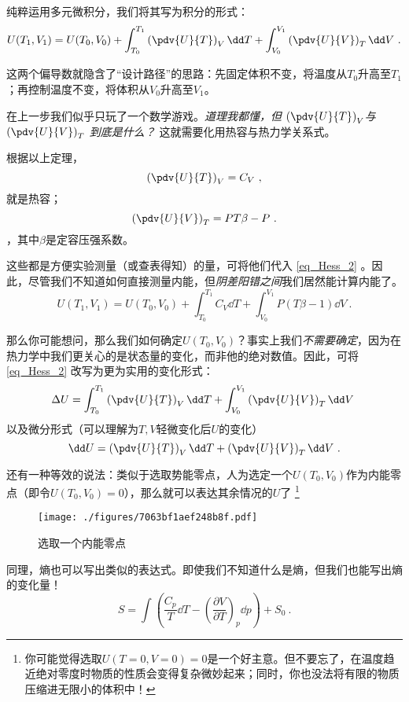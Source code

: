 纯粹运用多元微积分，我们将其写为积分的形式：
\begin{equation}\label{eq_Hess_2}
U(T_1,V_1)=U(T_0,V_0) + \int_{T_0}^{T_1} \left(\pdv{U}{T}\right)_V \dd T + \int_{V_0}^{V_1} \left(\pdv{U}{V}\right)_T \dd V ~.
\end{equation}

这两个偏导数就隐含了“设计路径”的思路：先固定体积不变，将温度从$T_0$升高至$T_1$；再控制温度不变，将体积从$V_0$升高至$V_1$。

在上一步我们似乎只玩了一个数学游戏。\textsl{道理我都懂，但 $\left(\pdv{U}{T}\right)_V$与$ \left(\pdv{U}{V}\right)_T $ 到底是什么？} 这就需要化用热容与热力学关系式。

根据以上定理，$$\left(\pdv{U}{T}\right)_V = C_V~,$$就是热容；$$ \left(\pdv{U}{V}\right)_T  = PT\beta-P ~.$$，其中$\beta$是定容压强系数。

这些都是方便实验测量（或查表得知）的量，可将他们代入 \autoref{eq_Hess_2} 。因此，尽管我们不知道如何直接测量内能，但\textsl{阴差阳错之间}我们居然能计算内能了。
\begin{equation}\label{eq_Hess_1}
U(T_1,V_1)=U(T_0,V_0) + \int_{T_0}^{T_1} C_V \dd T + \int_{V_0}^{V_1} P(T\beta-1) \dd V ~.
\end{equation}



那么你可能想问，那么我们如何确定$U(T_0,V_0)$？事实上我们\textsl{不需要确定}，因为在热力学中我们更关心的是状态量的变化，而非他的绝对数值。因此，可将\autoref{eq_Hess_2} 改写为更为实用的变化形式：
\begin{equation}
\Delta U = \int_{T_0}^{T_1} \left(\pdv{U}{T}\right)_V \dd T + \int_{V_0}^{V_1} \left(\pdv{U}{V}\right)_T \dd V ~
\end{equation}
以及微分形式（可以理解为$T,V$轻微变化后$U$的变化）
\begin{equation}
\dd U =  \left(\pdv{U}{T}\right)_V \dd T +\left(\pdv{U}{V}\right)_T \dd V ~.
\end{equation}

还有一种等效的说法：类似于选取势能零点，人为选定一个$U(T_0,V_0)$作为内能零点（即令$U(T_0,V_0)=0$），那么就可以表达其余情况的$U$了 \footnote{你可能觉得选取$U(T = 0,V = 0)=0$是一个好主意。但不要忘了，在温度趋近绝对零度时物质的性质会变得复杂微妙起来；同时，你也没法将有限的物质压缩进无限小的体积中！}

\begin{figure}[ht]
\centering
\texttt{[image: ./figures/7063bf1aef248b8f.pdf]}
\caption{选取一个内能零点} \label{fig_Hess_6}
\end{figure}

同理，熵也可以写出类似的表达式。即使我们不知道什么是熵，但我们也能写出熵的变化量！
\begin{equation}
S=\int \left(\frac{C_p}{T}\dd T-\left(\frac{\partial V}{\partial T}\right)_p\dd p\right)+S_0~.
\end{equation}
